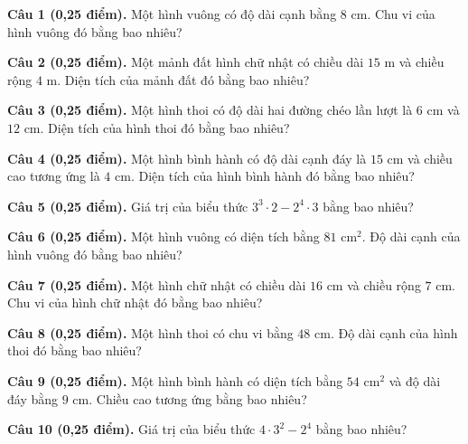 \documentclass[12pt,a4paper]{article}
\begin{document}
\noindent\textbf{Câu 1 (0,25 điểm).} Một hình vuông có độ dài cạnh bằng $8\text{ cm}$. Chu vi của hình vuông đó bằng bao nhiêu? \par\vspace{0.3mm}
\noindent\textbf{Câu 2 (0,25 điểm).} Một mảnh đất hình chữ nhật có chiều dài $15\text{ m}$ và chiều rộng $4\text{ m}$. Diện tích của mảnh đất đó bằng bao nhiêu? \par\vspace{0.3mm}
\noindent\textbf{Câu 3 (0,25 điểm).} Một hình thoi có độ dài hai đường chéo lần lượt là $6\text{ cm}$ và $12\text{ cm}$. Diện tích của hình thoi đó bằng bao nhiêu? \par\vspace{0.3mm}
\noindent\textbf{Câu 4 (0,25 điểm).} Một hình bình hành có độ dài cạnh đáy là $15\text{ cm}$ và chiều cao tương ứng là $4\text{ cm}$. Diện tích của hình bình hành đó bằng bao nhiêu? \par\vspace{0.3mm}
\noindent\textbf{Câu 5 (0,25 điểm).} Giá trị của biểu thức $3^3 \cdot 2 - 2^4 \cdot 3$ bằng bao nhiêu? \par\vspace{0.3mm}
\noindent\textbf{Câu 6 (0,25 điểm).} Một hình vuông có diện tích bằng $81\text{ cm}^2$. Độ dài cạnh của hình vuông đó bằng bao nhiêu? \par\vspace{0.3mm}
\noindent\textbf{Câu 7 (0,25 điểm).} Một hình chữ nhật có chiều dài $16\text{ cm}$ và chiều rộng $7\text{ cm}$. Chu vi của hình chữ nhật đó bằng bao nhiêu? \par\vspace{0.3mm}
\noindent\textbf{Câu 8 (0,25 điểm).} Một hình thoi có chu vi bằng $48\text{ cm}$. Độ dài cạnh của hình thoi đó bằng bao nhiêu? \par\vspace{0.3mm}
\noindent\textbf{Câu 9 (0,25 điểm).} Một hình bình hành có diện tích bằng $54\text{ cm}^2$ và độ dài đáy bằng $9\text{ cm}$. Chiều cao tương ứng bằng bao nhiêu? \par\vspace{0.3mm}
\noindent\textbf{Câu 10 (0,25 điểm).} Giá trị của biểu thức $4 \cdot 3^2 - 2^4$ bằng bao nhiêu? \par\vspace{0.3mm}
\vspace{0.4mm}
\end{document}
